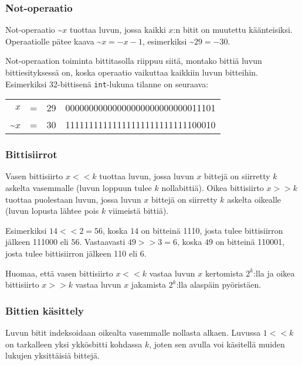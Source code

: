 \subsubsection{Not-operaatio}

Not-operaatio \textasciitilde$x$ tuottaa luvun,
jossa kaikki $x$:n bitit on muutettu käänteisiksi.
Operaatiolle pätee kaava \textasciitilde$x = -x-1$,
esimerkiksi \textasciitilde$29 = -30$.

Not-operaation toiminta bittitasolla riippuu siitä,
montako bittiä luvun bittiesityksessä on,
koska operaatio vaikuttaa kaikkiin luvun bitteihin.
Esimerkiksi 32-bittisenä \texttt{int}-lukuna
tilanne on seuraava:

\begin{center}
\begin{tabular}{rrrr}
$x$ & = & 29 &   00000000000000000000000000011101 \\
\textasciitilde$x$ & = & 30 & 11111111111111111111111111100010 \\
\end{tabular}
\end{center}


\subsubsection{Bittisiirrot}

Vasen bittisiirto $x < < k$ tuottaa luvun, jossa luvun $x$ bittejä
on siirretty $k$ askelta vasemmalle
(luvun loppuun tulee $k$ nollabittiä).
Oikea bittisiirto $x > > k$ tuottaa puolestaan
luvun, jossa luvun $x$ bittejä
on siirretty $k$ askelta oikealle 
(luvun lopusta lähtee pois $k$ viimeistä bittiä).

Esimerkiksi $14 < < 2 = 56$,
koska $14$ on bitteinä 1110,
josta tulee bittisiirron jälkeen 111000 eli $56$.
Vastaavasti $49 > > 3 = 6$,
koska $49$ on bitteinä 110001,
josta tulee bittisiirron jälkeen 110 eli $6$.

Huomaa, että vasen bittisiirto $x < < k$
vastaa luvun $x$ kertomista $2^k$:lla
ja oikea bittisiirto $x > > k$
vastaa luvun $x$ jakamista $2^k$:lla
alaspäin pyöristäen.

\subsubsection{Bittien käsittely}

Luvun bitit indeksoidaan oikealta vasemmalle
nollasta alkaen.
Luvussa $1 < < k$ on tarkalleen yksi ykkösbitti
kohdassa $k$, joten sen avulla voi käsitellä
muiden lukujen yksittäisiä bittejä.

